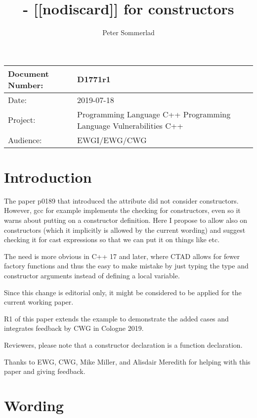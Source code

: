 \documentclass[ebook,11pt,article]{memoir}
\title{\papernumber{} - [[nodiscard]] for constructors}
\author{Peter Sommerlad}
\date{\paperdate}                %
\newcommand{\papernumber}{D1771r1}
\newcommand{\paperdate}{2019-07-18}
\begin{document}
\maketitle
\begin{center}
\begin{tabular}[t]{|l|p{8cm}|}\hline 
Document Number:&  \papernumber \\\hline
Date: & \paperdate \\\hline
Project: & Programming Language C++ \newline Programming Language Vulnerabilities C++\\\hline 
Audience: & EWGI/EWG/CWG\\\hline
\end{tabular}
\end{center}


\chapter{Introduction}

The  paper p0189 that introduced the \tcode{[[nodiscard]]} attribute did not consider constructors. However, gcc for example implements the checking for constructors, even so it warns about putting \tcode{[[nodiscard]]} on a constructor definition. Here I propose to allow  \tcode{[[nodiscard]]} also on constructors (which it implicitly is allowed by the current wording) and suggest checking it for cast expressions so that we can put it on things like  etc.

The need is more obvious in C++ 17 and later, where CTAD allows for fewer factory functions and thus the easy to make mistake by just typing the type and constructor arguments instead of defining a local variable.

Since this change is editorial only, it might be considered to be applied for the current working paper.

R1 of this paper extends the example to demonstrate the added cases and integrates feedback by CWG in Cologne 2019.

Reviewers, please note that a constructor declaration is a function declaration.

Thanks to EWG, CWG, Mike Miller, and Alisdair Meredith for helping with this paper and giving feedback.

\chapter{Wording}
\end{document}
